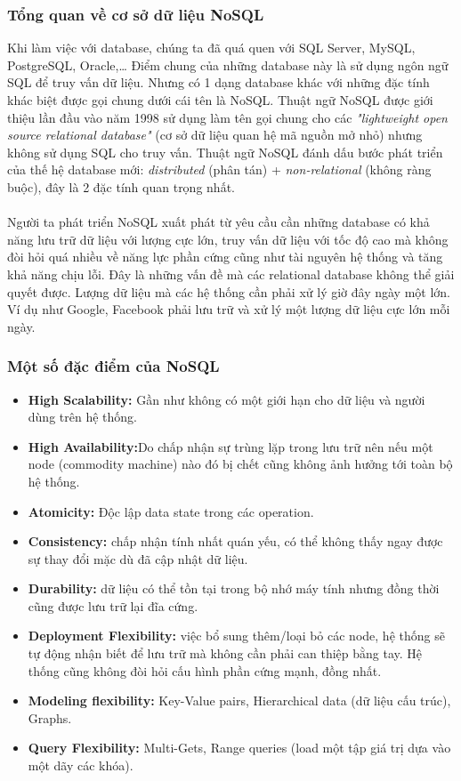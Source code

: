 \documentclass[12pt,a4paper]{report}
\begin{document}
\subsubsection{Tổng quan về cơ sở dữ liệu NoSQL}
Khi làm việc với database, chúng ta đã quá quen với SQL Server, MySQL, PostgreSQL, Oracle,… Điểm chung của những database này là sử dụng ngôn ngữ SQL để truy vấn dữ liệu. Nhưng có 1 dạng database khác với những đặc tính khác biệt được gọi chung dưới cái tên là NoSQL. Thuật ngữ NoSQL được giới thiệu lần đầu vào năm 1998 sử dụng làm tên gọi chung cho các \textit{"lightweight open source relational database"} (cơ sở dữ liệu quan hệ mã nguồn mở nhỏ) nhưng không sử dụng SQL cho truy vấn. Thuật ngữ NoSQL đánh dấu bước phát triển của thế hệ database mới: \textit{distributed} (phân tán) + \textit{non-relational} (không ràng buộc), đây là 2 đặc tính quan trọng nhất. \\\\
Người ta phát triển NoSQL xuất phát từ yêu cầu cần những database có khả năng lưu trữ dữ liệu với lượng cực lớn, truy vấn dữ liệu với tốc độ cao mà không đòi hỏi quá nhiều về năng lực phần cứng cũng như tài nguyên hệ thống và tăng khả năng chịu lỗi. Đây là những vấn đề mà các relational database không thể giải quyết được. Lượng dữ liệu mà các hệ thống cần phải xử lý giờ đây ngày một lớn. Ví dụ như Google, Facebook phải lưu trữ và xử lý một lượng dữ liệu cực lớn mỗi ngày.
\subsubsection{Một số đặc điểm của NoSQL}
\begin{itemize}
	\item \textbf{High Scalability:} Gần như không có một giới hạn cho dữ liệu và người dùng trên hệ thống.
	\item \textbf{High Availability:}Do chấp nhận sự trùng lặp trong lưu trữ nên nếu một node (commodity machine) nào đó bị chết cũng không ảnh hưởng tới toàn bộ hệ thống.
	\item \textbf{Atomicity:}  Độc lập data state trong các operation.
	\item \textbf{Consistency:} chấp nhận tính nhất quán yếu, có thể không thấy ngay được sự thay đổi mặc dù đã cập nhật dữ liệu.
	\item \textbf{Durability:} dữ liệu có thể tồn tại trong bộ nhớ máy tính nhưng đồng thời cũng được lưu trữ lại đĩa cứng.
	\item \textbf{Deployment Flexibility:} việc bổ sung thêm/loại bỏ các node, hệ thống sẽ tự động nhận biết để lưu trữ mà không cần phải can thiệp bằng tay. Hệ thống cũng không đòi hỏi cấu hình phần cứng mạnh, đồng nhất.
	\item \textbf{Modeling flexibility: }  Key-Value pairs, Hierarchical data (dữ liệu cấu trúc), Graphs.
	\item \textbf{Query Flexibility:} Multi-Gets, Range queries (load một tập giá trị dựa vào một dãy các khóa). 
\end{itemize}
\end{document}
